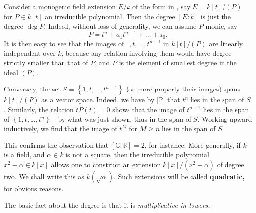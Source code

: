 \begin{example}
\label{monodeg2}
Consider a monogenic  field extension $E/k$ of the form in
, say $E = k[t]/(P)$ for $P \in k[t]$ an irreducible
polynomial.
Then the degree $[E:k]$ is just the degree $\deg P$. 
Indeed, without loss of generality, we can assume $P$ monic, say
\begin{equation} \label{P} P = t^n + a_1 t^{n-1} + \dots + a_0.\end{equation}
It is then easy to see that the images of $1, t, \dots, t^{n-1}$ in
$k[t]/(P)$ are linearly
independent over $k$, because any relation involving them would have
degree strictly smaller than that of $P$, and $P$ is the element of smallest
degree in the ideal $(P)$.

Conversely, the set $S=\left\{1, t, \dots, t^{n-1}\right\}$ (or more
properly their images) spans $k[t]/(P)$ as a vector space.
Indeed, we have by \eqref{P} that $t^n$ lies in the span of $S$.
Similarly, the relation $tP(t)=0$ shows that the image of  $t^{n+1}$ lies in the span of
$\left\{1, t, \dots, t^n\right\}$---by what was just shown, thus in the span of
$S$. Working upward inductively, we find
that the image of $t^M$ for $M  \geq n$ lies in the span of $S$.
\end{example} 

This confirms the observation that $[\mathbb{C}: \mathbb{R}] = 2$, for instance.
More generally, if $k$ is a field, and $\alpha \in k$ is not a square, then the
irreducible polynomial $x^2 - \alpha \in k[x]$ allows one to construct an
extension $k[x]/(x^2 - \alpha)$ of degree two.
We shall write this as $k(\sqrt{\alpha})$. Such extensions will be called
\textbf{quadratic,} for obvious reasons.


The basic fact about the degree is that it is \emph{multiplicative in
towers.}

